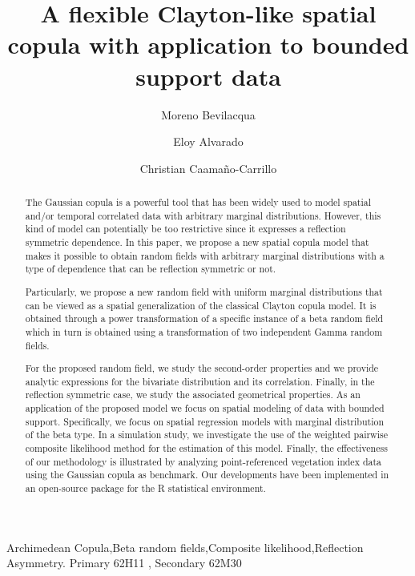 \documentclass[times,sort&compress,3p]{elsarticle}
\theoremstyle{plain}%
\theoremstyle{definition}
\begin{document}
\begin{frontmatter}

\title{A flexible Clayton-like spatial copula with application to bounded support  data}

\author[A1]{Moreno Bevilacqua}
\author[A2]{Eloy Alvarado}
\author[A3]{Christian Caama\~no-Carrillo}

\address[A1]{Facultad de Ingenier\'ia y Ciencias, Universidad Adolfo Ib\'a\~nez, Vi\~na del Mar, Chile\\
Dipartimento di Scienze Ambientali, Informatica e Statistica, Ca’ Foscari University of Venice, Venice, Italy}
\address[A2]{Departamento de Industrias, Universidad T\'ecnica Federico Santa Mar\'ia, Santiago, Chile}
\address[A3]{Departamento de Estad\'istica, Universidad del B\'io-B\'io, Concepci\'on, Chile}


\begin{abstract}
The Gaussian copula is a powerful tool that has been widely used to model spatial and/or temporal correlated data with arbitrary marginal distributions. However, this kind of model can potentially be too restrictive since it expresses a  reflection symmetric dependence. In this paper, we propose a new spatial copula model that makes it possible to obtain random fields with arbitrary marginal distributions with a type of dependence that can be reflection symmetric or  not.

Particularly, we propose a new random field with uniform marginal distributions that can be viewed as a spatial generalization of the classical Clayton copula model. It is obtained through a power transformation of a specific instance of a beta random field which in turn is obtained using a transformation of two independent Gamma random fields.

For the proposed random field, we study the second-order properties and  we provide analytic expressions for the bivariate distribution and its correlation.  Finally, in the reflection symmetric case, we study the associated geometrical properties.
As an application of the proposed model we focus on spatial modeling of  data with bounded support. Specifically, we focus on spatial regression models with marginal distribution of the  beta type. In a  simulation study, we investigate the use of the weighted pairwise composite likelihood method for the estimation of this model. Finally, the effectiveness of our methodology is illustrated by analyzing point-referenced vegetation index data using  the Gaussian copula  as benchmark.
Our developments have been implemented in an open-source package for the \textsf{R} statistical environment.
\end{abstract}

\begin{keyword} %
Archimedean Copula\sep  Beta random fields\sep Composite likelihood\sep Reflection Asymmetry.
\MSC[2020] Primary 62H11 \sep
Secondary 62M30
\end{keyword}

\end{frontmatter}
\end{document}

